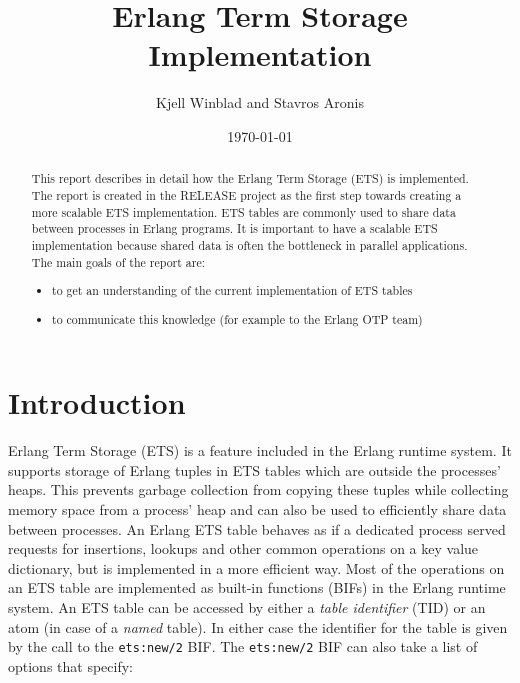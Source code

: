 \documentclass[aps,pre,preprint,nofootinbib]{revtex4}
\begin{document}
\title{Erlang Term Storage Implementation}
\author{Kjell Winblad and Stavros Aronis}
\date{\today}


\begin{abstract}

  This report describes in detail how the Erlang Term Storage (ETS) is implemented.
  The report is created in the RELEASE project as the first step towards creating a more scalable ETS implementation.
  ETS tables are commonly used to share data between processes in Erlang programs.
  It is important to have a scalable ETS implementation because shared data is often the bottleneck in parallel applications.
  The main goals of the report are:
  \begin{itemize}
   \item to get an understanding of the current implementation of ETS tables
   \item to communicate this knowledge (for example to the Erlang OTP team)
  \end{itemize} 

\end{abstract}

\maketitle

\section{Introduction}

Erlang Term Storage (ETS) is a feature included in the Erlang runtime system.
It supports storage of Erlang tuples in ETS tables which are outside the processes' heaps.
This prevents garbage collection from copying these tuples while collecting memory space from a process' heap and can also be used to efficiently share data between processes. %
An Erlang ETS table behaves as if a dedicated process served requests for insertions, lookups and other common operations on a key value dictionary, but is implemented in a more efficient way.
Most of the operations on an ETS table are implemented as built-in functions (BIFs) in the Erlang runtime system. 
An ETS table can be accessed by either a \emph{table identifier} (TID) or an atom (in case of a \emph{named} table).
In either case the identifier for the table is given by the call to the \verb|ets:new/2| BIF.
The \verb|ets:new/2| BIF can also take a list of options that specify: 
\end{document}
